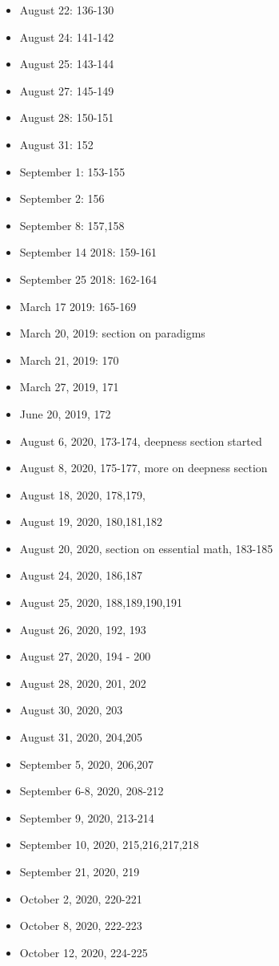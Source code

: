 \documentclass[12pt]{amsart}
\begin{document}
\begin{tiny}
\begin{itemize}
\item August 22: 136-130
\item August 24: 141-142
\item August 25: 143-144
\item August 27: 145-149
\item August 28: 150-151
\item August 31: 152
\item September 1: 153-155
\item September 2: 156
\item September 8: 157,158
\item September 14 2018: 159-161
\item September 25 2018: 162-164
\item March 17 2019: 165-169
\item March 20, 2019: section on paradigms
\item March 21, 2019: 170
\item March 27, 2019, 171
\item June 20, 2019, 172
\item August 6, 2020, 173-174, deepness section started
\item August 8, 2020, 175-177, more on deepness section
\item August 18, 2020, 178,179,
\item August 19, 2020, 180,181,182 
\item August 20, 2020, section on essential math, 183-185
\item August 24, 2020, 186,187
\item August 25, 2020, 188,189,190,191
\item August 26, 2020, 192, 193
\item August 27, 2020, 194 - 200
\item August 28, 2020, 201, 202
\item August 30, 2020, 203
\item August 31, 2020, 204,205
\item September 5, 2020, 206,207
\item September 6-8, 2020, 208-212
\item September 9, 2020, 213-214
\item September 10, 2020, 215,216,217,218
\item September 21, 2020, 219
\item October 2, 2020, 220-221
\item October 8, 2020, 222-223
\item October 12, 2020, 224-225

\end{itemize}
\end{tiny}
\end{document}
